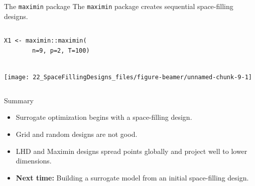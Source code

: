 \documentclass[
  9pt,
  ignorenonframetext,
]{beamer}
\providecommand{\tightlist}{%
  \setlength{\itemsep}{0pt}\setlength{\parskip}{0pt}}
\begin{document}
\begin{frame}[fragile]{The \texttt{maximin} package}
\protect\hypertarget{the-maximin-package}{}
The \texttt{maximin} package creates sequential space-filling designs.
\bigskip

\begin{columns}
\begin{column}{0.5\textwidth}
\texttt{X1 <- maximin::maximin(\\$\quad\quad\quad\quad$n=9, p=2, T=100)\\$\quad$}
\bigskip

\begin{center}\texttt{[image: 22\_SpaceFillingDesigns\_files/figure-beamer/unnamed-chunk-9-1]} \end{center}
\end{column}
\end{columns}

\bigskip
{}
\end{frame}

\begin{frame}{Summary}
\protect\hypertarget{summary}{}
\begin{itemize}
\tightlist
\item
  Surrogate optimization begins with a space-filling design.
\item
  Grid and random designs are not good.
\item
  LHD and Maximin designs spread points globally and project well to
  lower dimensions.
\item
  \textbf{Next time:} Building a surrogate model from an initial
  space-filling design.
\end{itemize}
\end{frame}
\end{document}
